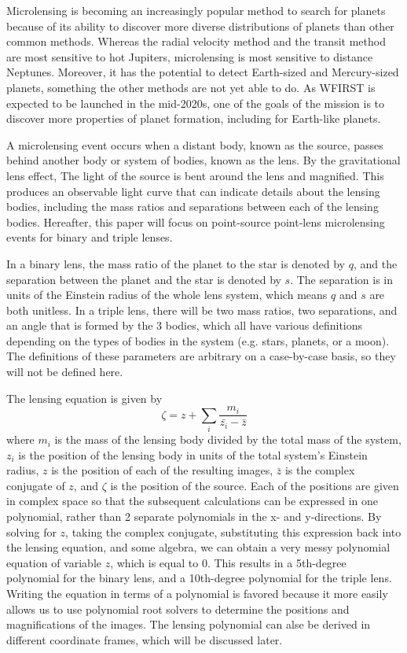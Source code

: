 \documentclass{article}
\begin{document}
Microlensing is becoming an increasingly popular method to search for
planets because of its ability to discover more diverse distributions
of planets than other common methods. Whereas the radial velocity method
and the transit method are most sensitive to hot Jupiters, microlensing
is most sensitive to distance Neptunes. Moreover, it has the potential
to detect Earth-sized and Mercury-sized planets, something the other
methods are not yet able to do. As WFIRST is expected to be launched
in the mid-2020s, one of the goals of the mission is to discover more
properties of planet formation, including for Earth-like planets.

A microlensing event occurs when a distant body, known as the source,
passes behind another body or system of bodies, known as the lens. By
the gravitational lens effect, The light of the source is bent around
the lens and magnified. This produces an observable light curve that can
indicate details about the lensing bodies, including the mass ratios and
separations between each of the lensing bodies. Hereafter, this paper will
focus on point-source point-lens microlensing events for binary and triple
lenses.

In a binary lens, the mass ratio of the planet to the star is denoted by $q$,
and the separation between the planet and the star is denoted by $s$. The
separation is in units of the Einstein radius of the whole lens system, 
which means $q$ and $s$ are both unitless. In a triple lens, there will be two
mass ratios, two separations, and an angle that is formed by the 3 bodies, 
which all have various definitions depending on the types of bodies in the
system (e.g. stars, planets, or a moon). The definitions of these parameters
are arbitrary on a case-by-case basis, so they will not be defined here.

The lensing equation is given by
\begin{equation}
\zeta = z + \sum_{i} \frac{m_{i}}{\bar{z_{i}} - \bar{z}}
\end{equation}
where ${m_{i}}$ is the mass of the lensing body divided by the total mass
of the system, ${z_{i}}$ is the position of the lensing body in units of the
total system's Einstein radius, $z$ is the position of each of the resulting 
images, $\bar{z}$ is the complex conjugate of $z$, and $\zeta$ is the position
of the source. Each of the positions are given in complex space so that the
subsequent calculations can be expressed in one polynomial, rather than 2
separate polynomials in the x- and y-directions. By solving for $z$, taking
the complex conjugate, substituting this expression back into the lensing
equation, and some algebra, we can obtain a very messy polynomial equation
of variable $z$, which is equal to $0$. This results in a 5th-degree
polynomial for the binary lens, and a 10th-degree polynomial for the triple
lens. Writing the equation in terms of a polynomial is favored because it
more easily allows us to use polynomial root solvers to determine the
positions and magnifications of the images. The lensing polynomial can 
alse be derived in different coordinate frames, which will be discussed later.
\end{document}
